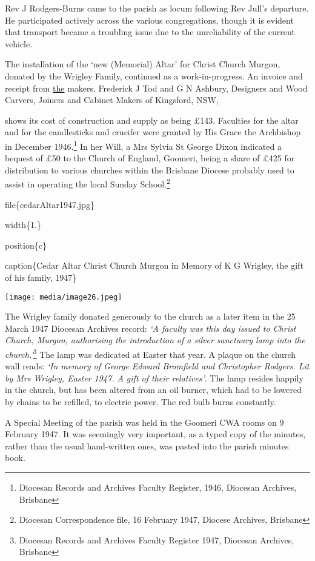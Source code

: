 Rev J Rodgers-Burns came to the parish as locum following Rev Jull's departure. He participated actively across the various congregations, though it is evident that transport became a troubling issue due to the unreliability of the current vehicle.

The installation of the `new (Memorial) Altar' for Christ Church Murgon, donated by the Wrigley Family, continued as a work-in-progress. An invoice and receipt from \underline{the} makers, Frederick J Tod and G N Ashbury, Designers and Wood Carvers, Joiners and Cabinet Makers of Kingsford, NSW,

shows its cost of construction and supply as being £143. Faculties for the altar and for the candlesticks and crucifer were granted by His Grace the Archbishop in December 1946.\footnote{Diocesan Records and Archives Faculty Register, 1946, Diocesan Archives, Brisbane} In her Will, a Mrs Sylvia St George Dixon indicated a bequest of £50 to the Church of England, Goomeri, being a share of £425 for distribution to various churches within the Brisbane Diocese probably used to assist in operating the local Sunday School.\footnote{Diocesan Correspondence file, 16 February 1947, Diocese Archives, Brisbane}

file\{cedarAltar1947.jpg\}

width\{1.\}

position\{c\}

caption\{Cedar Altar Christ Church Murgon in Memory of K G Wrigley, the gift of his family, 1947\}

\texttt{[image: media/image26.jpeg]}

The Wrigley family donated generously to the church as a later item in the 25 March 1947 Diocesan Archives record: \emph{`A faculty was this day issued to Christ Church, Murgon, authorising the introduction of a silver sanctuary lamp into the church.'}\footnote{Diocesan Records and Archives Faculty Register 1947, Diocesan Archives, Brisbane} The lamp was dedicated at Easter that year. A plaque on the church wall reads: \emph{`In memory of George Edward Bromfield and Christopher Rodgers. Lit by Mrs Wrigley, Easter 1947. A gift of their relatives'}. The lamp resides happily in the church, but has been altered from an oil burner, which had to be lowered by chains to be refilled, to electric power. The red bulb burns constantly.

A Special Meeting of the parish was held in the Goomeri CWA rooms on 9 February 1947. It was seemingly very important, as a typed copy of the minutes, rather than the usual hand-written ones, was pasted into the parish minutes book.

